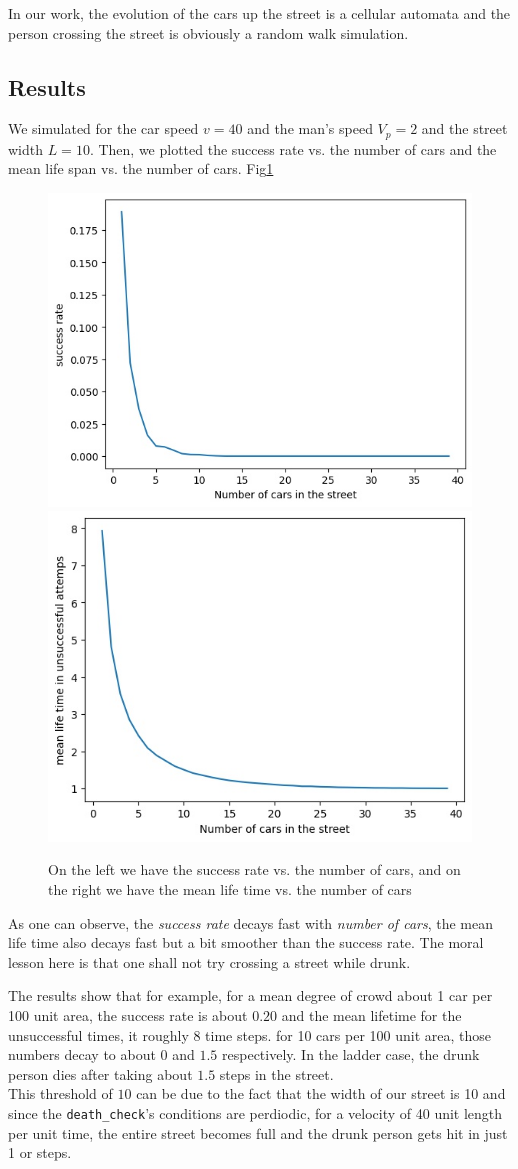 \documentclass[12pt]{article}
\begin{document}
	In our work, the evolution of the cars up the street is a cellular automata and the person crossing the
	street is obviously a random walk simulation.
	\subsection{Results}
	 We simulated for the car speed $v = 40$ and the man's speed $V_p = 2$ and the street width $L = 10$.
	 Then, we plotted the success rate vs. the number of cars and the mean life span vs. the number of cars.
	 Fig\ref{fig:drunk}
	 \begin{figure}[h]
	 	\centering
		\includegraphics[width=.4\linewidth]{../p4/success.jpg}
		\includegraphics[width=.4\linewidth]{../p4/meanlife.jpg}
		\label{fig:drunk}
		\caption{On the left we have the success rate vs. the number of cars, and on the right we have
		the mean life time vs. the number of cars}
	 \end{figure}
 	As one can observe, the \emph{success rate} decays fast with \emph{number of cars}, the mean life time
 	also decays fast but a bit smoother than the success rate. The moral lesson here is that one shall not try crossing a street while drunk.
 	
 	The results show that for example, for a mean degree of crowd about 1 car per 100 unit area, the success rate is about $0.20$ and the mean lifetime for the unsuccessful times, it roughly 8 time steps.
 	for 10 cars per 100 unit area, those numbers decay to about $0$ and $1.5$ respectively.
 	In the ladder case, the drunk person dies after taking about $1.5$ steps in the street.\\
 	This threshold of $10$ can be due to the fact that the width of our street is 10 and since the \texttt{death\_check}'s conditions are perdiodic, for a velocity of 40 unit length per unit time, the entire street becomes full and the drunk person gets hit in just 1 or steps.
\end{document}
